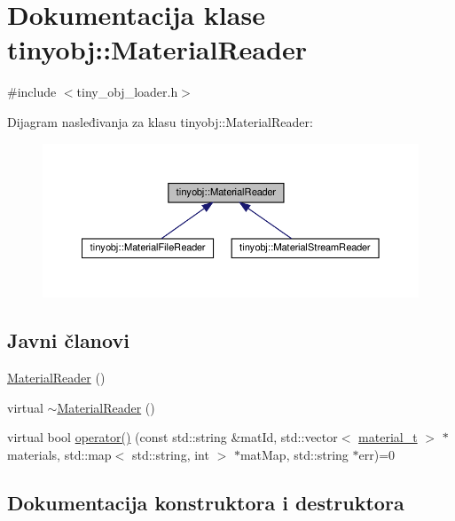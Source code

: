 \hypertarget{classtinyobj_1_1MaterialReader}{}\section{Dokumentacija klase tinyobj\+:\+:Material\+Reader}
\label{classtinyobj_1_1MaterialReader}


{\ttfamily \#include $<$tiny\+\_\+obj\+\_\+loader.\+h$>$}



Dijagram nasleđivanja za klasu tinyobj\+:\+:Material\+Reader\+:\nopagebreak
\begin{figure}[H]
\begin{center}
\leavevmode
\includegraphics[width=350pt]{classtinyobj_1_1MaterialReader__inherit__graph}
\end{center}
\end{figure}
\subsection*{Javni članovi}
\begin{DoxyCompactItemize}
\item 
\hyperlink{classtinyobj_1_1MaterialReader_a701bdd6217518e0afb5596fcb59925b6}{Material\+Reader} ()
\item 
virtual \hyperlink{classtinyobj_1_1MaterialReader_afd62ceccd9b373801226e037ea1a5f9f}{$\sim$\+Material\+Reader} ()
\item 
virtual bool \hyperlink{classtinyobj_1_1MaterialReader_ad165d8cc1bd989f8548a9258b0881a89}{operator()} (const std\+::string \&mat\+Id, std\+::vector$<$ \hyperlink{structtinyobj_1_1material__t}{material\+\_\+t} $>$ $\ast$materials, std\+::map$<$ std\+::string, int $>$ $\ast$mat\+Map, std\+::string $\ast$err)=0
\end{DoxyCompactItemize}


\subsection{Dokumentacija konstruktora i destruktora}
\mbox{\label{classtinyobj_1_1MaterialReader_a701bdd6217518e0afb5596fcb59925b6}} 
